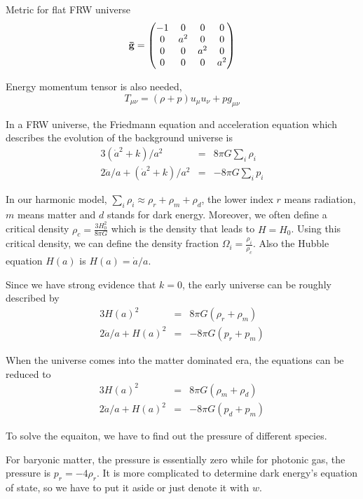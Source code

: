 \documentclass[12pt,a4paper]{book}
\begin{document}
Metric for flat FRW universe
\begin{equation}
\bf{\bar g} = 
\begin{pmatrix}
-1 & 0 & 0 & 0 \\
0 & a^2 & 0 & 0 \\
0 & 0 & a^2 & 0 \\
0&0&0& a^2
\end{pmatrix}
\end{equation}

Energy momentum tensor is also needed,
\begin{equation}
	T_{\mu\nu} = (\rho + p)u_\mu u_\nu + p g_{\mu\nu}
\end{equation}





In a FRW universe, the Friedmann equation and acceleration equation which describes the evolution of the background universe is
\begin{eqnarray}
	3(\dot a^2 + k)/ a^2 &=& 8\pi G \sum_i \rho_i \\
	2\ddot a/a + (\dot a^2 + k)/a^2 &=&-8\pi G \sum_i p_i
\end{eqnarray}

In our harmonic model, $\sum_i \rho_i \approx \rho_r + \rho_m + \rho_d$, the lower index $r$ means radiation, $m$ means matter and $d$ stands for dark energy. Moreover, we often define a critical density $\rho_c = \frac{3H_0^2}{8\pi G}$ which is the density that leads to $H=H_0$. Using this critical density, we can define the density fraction $\Omega_i = \frac{\rho_i}{\rho_c}$. Also the Hubble equation $H(a)$ is $H(a) = \dot a/a$.

Since we have strong evidence that $k=0$, the early universe can be roughly described by
\begin{eqnarray}
	3 H(a)^2 &=& 8\pi G (\rho_r + \rho_m) \\
	2 \ddot a/a + H(a)^2 &=& -8\pi G (p_r + p_m)
\end{eqnarray}

When the universe comes into the matter dominated era, the equations can be reduced to
\begin{eqnarray}
	3 H(a)^2 &=& 8\pi G (\rho_m + \rho_d) \\
	2\ddot a/a + H(a)^2 &=& -8\pi G (p_d + p_m)
\end{eqnarray}

To solve the equaiton, we have to find out the pressure of different species.

For baryonic matter, the pressure is essentially zero while for photonic gas, the pressure is $p_r = -4 \rho_r$.
It is more complicated to determine dark energy's equation of state, so we have to put it aside or just denote it with $w$.
\end{document}
